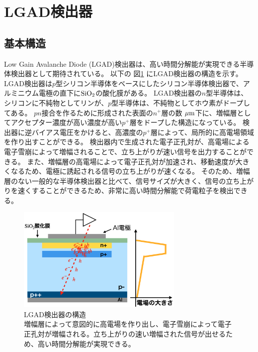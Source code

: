 \section{LGAD検出器}
\subsection{基本構造}
Low Gain Avalanche Diode (LGAD)検出器は、高い時間分解能が実現できる半導体検出器として期待されている。
以下の 図\ref{fg:LGAD} にLGAD検出器の構造を示す。
LGAD検出器は$p$型シリコン半導体をベースにしたシリコン半導体検出器で、アルミニウム電極の直下に$\rm{SiO_2}$の酸化膜がある。
LGAD検出器の$n$型半導体は、シリコンに不純物としてリンが、$p$型半導体は、不純物としてホウ素がドープしてある。
$pn$接合を作るために形成された表面の${n}^+$層の数 $\rm{\mu m}$下に、増幅層としてアクセプター濃度が高い濃度が高い$p^+$層をドープした構造になっている。
検出器に逆バイアス電圧をかけると、高濃度の$p^+$層によって、局所的に高電場領域を作り出すことができる。
検出器内で生成された電子正孔対が、高電場による電子雪崩によって増幅されることで、立ち上がりが速い信号を出力することができる。
また、増幅層の高電場によって電子正孔対が加速され、移動速度が大きくなるため、電極に誘起される信号の立ち上がりが速くなる。
そのため、増幅層のない一般的な半導体検出器と比べて、信号サイズが大きく、信号の立ち上がりを速くすることができるため、非常に高い時間分解能で荷電粒子を検出できる。


\begin{figure}[h]
    \centering
    \includegraphics[width=8cm]{fig/ch1/LGAD.png}
    \caption[LGAD検出器の構造]{LGAD検出器の構造\\増幅層によって意図的に高電場を作り出し、電子雪崩によって電子正孔対が増幅される。立ち上がりの速い増幅された信号が出せるため、高い時間分解能が実現できる。}
    \label{fg:LGAD}
\end{figure}

